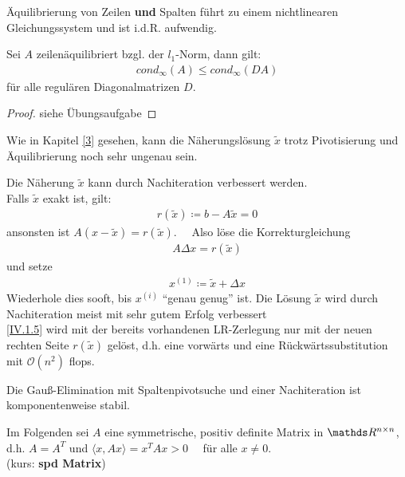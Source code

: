 Äquilibrierung von Zeilen \textbf{und} Spalten führt zu einem nichtlinearen Gleichungssystem und ist i.d.R. aufwendig.


\begin{Leme}
	\label{4.3.1}
	Sei $A$ zeilenäquilibriert bzgl. der $l_1$-Norm, dann gilt:
	\begin{gather}
	cond_{\infty}(A) \leq cond_{\infty}(DA)  \label{IV.1.3}
	\end{gather}
	für alle regulären Diagonalmatrizen $D$.
\end{Leme} 

\begin{proof}
	siehe Übungsaufgabe
\end{proof}

Wie in Kapitel \ref{3} gesehen, kann die Näherungslösung $\widetilde{x}$ 
trotz Pivotisierung und Äquilibrierung noch sehr ungenau sein.


 
Die Näherung $\widetilde{x}$ kann durch Nachiteration verbessert werden. \\
Falls $\widetilde{x}$ exakt ist, gilt:
\begin{gather}
r(\widetilde{x}) \coloneqq b-A\widetilde{x} =0 \label{IV.1.4}
\end{gather}
ansonsten ist $A(x-\widetilde{x})=r(\widetilde{x}).$ \ \
Also löse die Korrekturgleichung
\begin{gather}
A\Delta x = r(\widetilde{x}) 	\label{IV.1.5}
\end{gather}
und setze
\begin{gather*}
x^{(1)} \coloneqq \widetilde{x} +\Delta x
\end{gather*}
Wiederhole dies sooft, bis $x^{(i)}$ \enquote{genau genug} ist.
Die Lösung $\widetilde{x}$ wird durch Nachiteration meist mit sehr gutem Erfolg verbessert
\cite[genaueres in ][]{dahmenreusken}\\
\eqref{IV.1.5} wird mit der bereits vorhandenen LR-Zerlegung
nur mit der neuen rechten Seite $r(\widetilde{x})$ gelöst, 
d.h. eine vorwärts und eine Rückwärtssubstitution
mit $\mathcal{O}(n^2)$ flops.

\begin{Beme}
	Die Gauß-Elimination mit Spaltenpivotsuche und einer Nachiteration
	ist komponentenweise stabil.
\end{Beme}


Im Folgenden sei $A$ eine symmetrische, positiv definite Matrix in $\Renn $, d.h.
$A=A^T$ und $\langle x, Ax \rangle = x^TAx > 0 \quad $ für alle $ x\neq 0$. \\
(kurs: \textbf{spd Matrix}) \index{spd Matrix}

